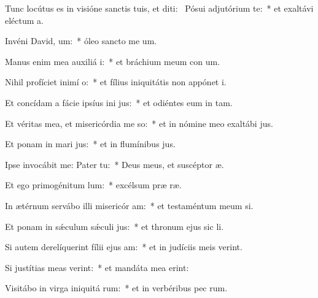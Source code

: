 \item Tunc locútus es in visióne sanctis tuis, et diti:~\pscross{} Pósui adjutórium  te:~* et exaltávi eléctum   a.
\item Invéni David,  um:~* óleo sancto me  um.
\item Manus enim mea auxiliá i:~* et bráchium meum con um.
\item Nihil profíciet inimí  o:~* et fílius iniquitátis non appónet  i.
\item Et concídam a fácie ipsíus ini jus:~* et odiéntes eum in  tam.
\item Et véritas mea, et misericórdia me  so:~* et in nómine meo exaltábi  jus.
\item Et ponam in mari  jus:~* et in flumínibus  jus.
\item Ipse invocábit me: Pater   tu:~* Deus meus, et suscéptor  æ.
\item Et ego primogénitum  lum:~* excélsum præ  ræ.
\item In ætérnum servábo illi misericór am:~* et testaméntum meum  si.
\item Et ponam in sǽculum sǽculi  jus:~* et thronum ejus sic  li.
\item Si autem derelíquerint fílii ejus  am:~* et in judíciis meis  verint.
\item Si justítias meas verint:~* et mandáta mea  erint:
\item Visitábo in virga iniquitá rum:~* et in verbéribus pec rum.
